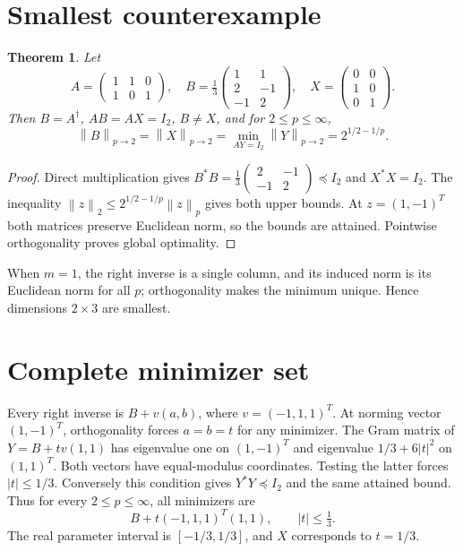 \documentclass[11pt]{article}
\newtheorem{theorem}{Theorem}
\newcommand{\norm}[1]{\left\lVert#1\right\rVert}
\begin{document}
\section{Smallest counterexample}
\begin{theorem}
Let
\[
A=\begin{pmatrix}1&1&0\\1&0&1\end{pmatrix},\quad
B=\tfrac13\begin{pmatrix}1&1\\2&-1\\-1&2\end{pmatrix},\quad
X=\begin{pmatrix}0&0\\1&0\\0&1\end{pmatrix}.
\]
Then $B=A^\dagger$, $AB=AX=I_2$, $B\ne X$, and for $2\le p\le\infty$,
\[\boxed{\norm B_{p\to2}=\norm X_{p\to2}=\min_{AY=I_2}\norm Y_{p\to2}=2^{1/2-1/p}.}\]
\end{theorem}
\begin{proof}
Direct multiplication gives $B^*B=\tfrac13\left(\begin{smallmatrix}2&-1\\-1&2\end{smallmatrix}\right)\preceq I_2$ and $X^*X=I_2$. The inequality $\norm z_2\le2^{1/2-1/p}\norm z_p$ gives both upper bounds. At $z=(1,-1)^T$ both matrices preserve Euclidean norm, so the bounds are attained. Pointwise orthogonality proves global optimality.
\end{proof}
When $m=1$, the right inverse is a single column, and its induced norm is its Euclidean norm for all $p$; orthogonality makes the minimum unique. Hence dimensions $2\times3$ are smallest.
\section{Complete minimizer set}
Every right inverse is $B+v(a,b)$, where $v=(-1,1,1)^T$. At norming vector $(1,-1)^T$, orthogonality forces $a=b=t$ for any minimizer. The Gram matrix of $Y=B+t v(1,1)$ has eigenvalue one on $(1,-1)^T$ and eigenvalue $1/3+6|t|^2$ on $(1,1)^T$. Both vectors have equal-modulus coordinates. Testing the latter forces $|t|\le1/3$. Conversely this condition gives $Y^*Y\preceq I_2$ and the same attained bound. Thus for every $2\le p\le\infty$, all minimizers are
\[\boxed{B+t(-1,1,1)^T(1,1),\qquad |t|\le\tfrac13.}\]
The real parameter interval is $[-1/3,1/3]$, and $X$ corresponds to $t=1/3$.
\end{document}
